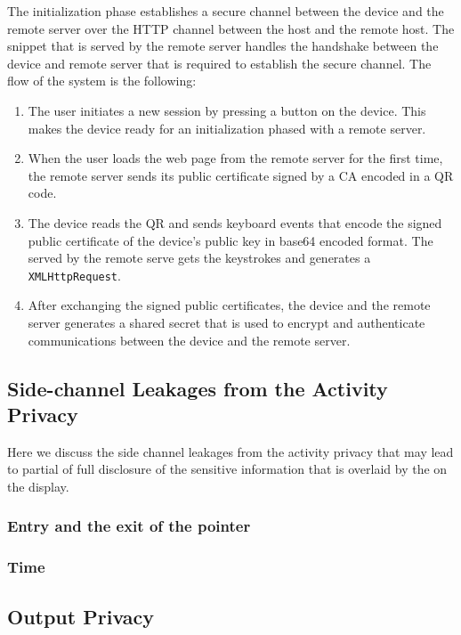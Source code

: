  The initialization phase establishes a secure channel between the device and the remote server over the HTTP channel between the host and the remote host. The \js snippet that is served by the remote server handles the handshake between the device and remote server that is required to establish the secure channel. The flow of the system is the following: 
\begin{enumerate}
  \item The user initiates a new session by pressing a button on the device. This makes the device ready for an initialization phased with a remote server.
  \item When the user loads the web page from the remote server for the first time, the remote server sends its public certificate signed by a CA encoded in a QR code. 
  \item The device reads the QR and sends keyboard events that encode the signed public certificate of the device's public key in base64 encoded format. The \js served by the remote serve gets the keystrokes and generates a \texttt{XMLHttpRequest}.
  \item After exchanging the signed public certificates, the device and the remote server generates a shared secret that is used to encrypt and authenticate communications between the device and the remote server.
\end{enumerate}

\subsection{Side-channel Leakages from the Activity Privacy}
\label{sec:systemDesign:sideChanneLeakage}

Here we discuss the side channel leakages from the activity privacy that may lead to partial of full disclosure of the sensitive information that is overlaid by the \device on the display.

\subsubsection{Entry and the exit of the pointer}

\subsubsection{Time }


\subsection{Output Privacy}
\label{sec:systemDesign:outputPrivacy}

